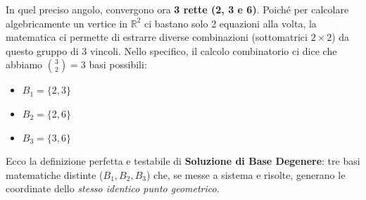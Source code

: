 \documentclass[12pt, a4paper]{article}
\begin{document}
	In quel preciso angolo, convergono ora \textbf{3 rette (2, 3 e 6)}. Poiché per calcolare algebricamente un vertice in $\mathbb{R}^2$ ci bastano solo 2 equazioni alla volta, la matematica ci permette di estrarre diverse combinazioni (sottomatrici $2 \times 2$) da questo gruppo di 3 vincoli. Nello specifico, il calcolo combinatorio ci dice che abbiamo $\binom{3}{2} = 3$ basi possibili:
	
	\begin{itemize}[label=$\circ$, itemsep=2pt, leftmargin=1.5cm]
		\item $B_1 = \{2, 3\}$
		\item $B_2 = \{2, 6\}$
		\item $B_3 = \{3, 6\}$
	\end{itemize}
	
	Ecco la definizione perfetta e testabile di \textbf{Soluzione di Base Degenere}: tre basi matematiche distinte ($B_1, B_2, B_3$) che, se messe a sistema e risolte, generano le coordinate dello \textit{stesso identico punto geometrico}.
	
\end{document}
